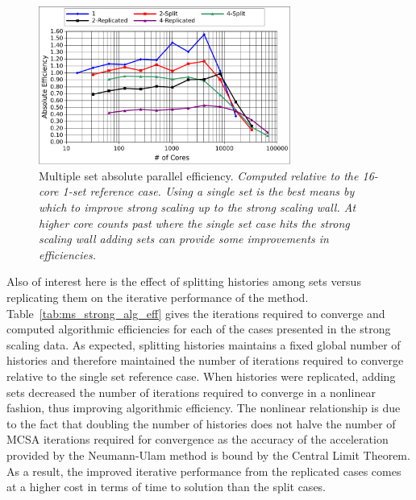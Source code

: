 \documentclass{snamc2013}
\begin{document}
\begin{figure}[H]
  \begin{center}
    \includegraphics[width=3.25in]{titan_strong_ms_eff.pdf}
  \end{center}
  \caption{Multiple set absolute parallel efficiency.
    \textit{Computed relative to the 16-core 1-set reference
      case. Using a single set is the best means by which to improve
      strong scaling up to the strong scaling wall. At higher core
      counts past where the single set case hits the strong scaling
      wall adding sets can provide some improvements in
      efficiencies.}}
  \label{fig:titan_strong_ms_eff}
\end{figure}

Also of interest here is the effect of splitting histories among sets
versus replicating them on the iterative performance of the
method. Table~\ref{tab:ms_strong_alg_eff} gives the iterations
required to converge and computed algorithmic efficiencies for each of
the cases presented in the strong scaling data. As expected, splitting
histories maintains a fixed global number of histories and therefore
maintained the number of iterations required to converge relative to
the single set reference case. When histories were replicated, adding
sets decreased the number of iterations required to converge in a
nonlinear fashion, thus improving algorithmic efficiency. The
nonlinear relationship is due to the fact that doubling the number of
histories does not halve the number of MCSA iterations required for
convergence as the accuracy of the acceleration provided by the
Neumann-Ulam method is bound by the Central Limit Theorem. As a
result, the improved iterative performance from the replicated cases
comes at a higher cost in terms of time to solution than the split
cases.
\end{document}
